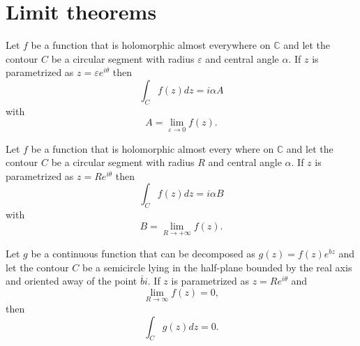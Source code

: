 \section{Limit theorems}

    \begin{theorem}\label{complexcalculus:theorem:small_limit}
        Let $f$ be a function that is holomorphic almost everywhere on $\mathbb{C}$ and let the contour $C$ be a circular segment with radius $\varepsilon$ and central angle $\alpha$. If $z$ is parametrized as $z = \varepsilon e^{i\theta}$ then\[\int_Cf(z)dz = i\alpha A\] with \[A = \lim_{\varepsilon\rightarrow0}f(z).\]
    \end{theorem}

    \begin{theorem}\label{complexcalculus:theorem:great_limit}
        Let $f$ be a function that is holomorphic almost every where on $\mathbb{C}$ and let the contour $C$ be a circular segment with radius $R$ and central angle $\alpha$. If $z$ is parametrized as $z = Re^{i\theta}$ then\[\int_Cf(z)dz = i\alpha B\] with \[B = \lim_{R\rightarrow+\infty}f(z).\]
    \end{theorem}

    \begin{theorem}\label{complexcalculus:theorem:jordan}
        Let $g$ be a continuous function that can be decomposed as $g(z) = f(z)e^{bz}$ and let the contour $C$ be a semicircle lying in the half-plane bounded by the real axis and oriented away of the point $\overline{b}i$. If $z$ is parametrized as $z=Re^{i\theta}$ and \[\lim_{R\rightarrow\infty}f(z) = 0,\] then \[\int_Cg(z)dz = 0.\]
    \end{theorem}